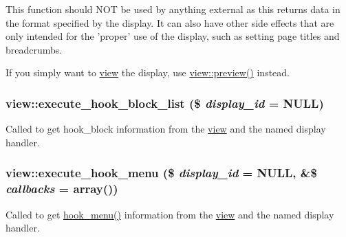 This function should NOT be used by anything external as this returns data in the format specified by the display. It can also have other side effects that are only intended for the 'proper' use of the display, such as setting page titles and breadcrumbs.

If you simply want to \hyperlink{classview}{view} the display, use \hyperlink{classview_ae279461b2f1636e802587901acdf3bd2}{view::preview()} instead. \hypertarget{classview_a0eea3903963084753464702a9c399406}{
\subsubsection[{execute\_\-hook\_\-block\_\-list}]{\setlength{\rightskip}{0pt plus 5cm}view::execute\_\-hook\_\-block\_\-list (\$ {\em display\_\-id} = {\ttfamily NULL})}}
\label{classview_a0eea3903963084753464702a9c399406}
Called to get hook\_\-block information from the \hyperlink{classview}{view} and the named display handler. \hypertarget{classview_a2e63acdea758605cdb1ce0a8db979ee2}{
\subsubsection[{execute\_\-hook\_\-menu}]{\setlength{\rightskip}{0pt plus 5cm}view::execute\_\-hook\_\-menu (\$ {\em display\_\-id} = {\ttfamily NULL}, \/  \&\$ {\em callbacks} = {\ttfamily array()})}}
\label{classview_a2e63acdea758605cdb1ce0a8db979ee2}
Called to get \hyperlink{group__hooks_ga5c95244fea59b25666e409759e133ded}{hook\_\-menu()} information from the \hyperlink{classview}{view} and the named display handler.



